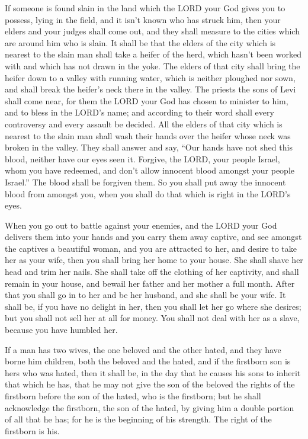  If someone is found slain in the land which the LORD your
God gives you to possess, lying in the field, and it isn't known who has
struck him,  then your elders and your judges shall come
out, and they shall measure to the cities which are around him who is
slain.  It shall be that the elders of the city which is
nearest to the slain man shall take a heifer of the herd, which hasn't
been worked with and which has not drawn in the yoke.  The
elders of that city shall bring the heifer down to a valley with running
water, which is neither ploughed nor sown, and shall break the heifer's
neck there in the valley.  The priests the sons of Levi
shall come near, for them the LORD your God has chosen to minister to
him, and to bless in the LORD's name; and according to their word shall
every controversy and every assault be decided.  All the
elders of that city which is nearest to the slain man shall wash their
hands over the heifer whose neck was broken in the valley.
 They shall answer and say, ``Our hands have not shed this
blood, neither have our eyes seen it.  Forgive, the LORD,
your people Israel, whom you have redeemed, and don't allow innocent
blood amongst your people Israel.'' The blood shall be forgiven them.
 So you shall put away the innocent blood from amongst
you, when you shall do that which is right in the LORD's eyes.

 When you go out to battle against your enemies, and the
LORD your God delivers them into your hands and you carry them away
captive,  and see amongst the captives a beautiful woman,
and you are attracted to her, and desire to take her as your wife,
 then you shall bring her home to your house. She shall
shave her head and trim her nails.  She shall take off
the clothing of her captivity, and shall remain in your house, and
bewail her father and her mother a full month. After that you shall go
in to her and be her husband, and she shall be your wife.
 It shall be, if you have no delight in her, then you
shall let her go where she desires; but you shall not sell her at all
for money. You shall not deal with her as a slave, because you have
humbled her.

 If a man has two wives, the one beloved and the other
hated, and they have borne him children, both the beloved and the hated,
and if the firstborn son is hers who was hated,  then it
shall be, in the day that he causes his sons to inherit that which he
has, that he may not give the son of the beloved the rights of the
firstborn before the son of the hated, who is the firstborn;
 but he shall acknowledge the firstborn, the son of the
hated, by giving him a double portion of all that he has; for he is the
beginning of his strength. The right of the firstborn is his.

